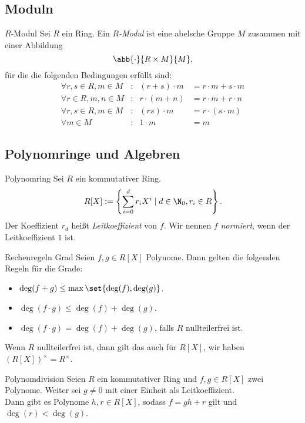 \subsection{Moduln}

\begin{karte}{\(R\)-Modul}
    Sei \(R\) ein Ring. Ein \textit{\(R\)-Modul} ist eine abelsche 
    Gruppe \(M\) zusammen mit einer Abbildung 
    \[ \abb{\cdot}{R\times M}{M}, \]
    für die die folgenden Bedingungen erfüllt sind: 
    \begin{align*}
        \forall r,s\in R, m \in M&: &(r+s)\cdot m &= r\cdot m + s \cdot m \\
        \forall r\in R, m,n\in M&: &r\cdot (m+n) &= r \cdot m + r \cdot n \\
        \forall r,s\in R, m\in M&: &(rs) \cdot m &= r \cdot (s \cdot m) \\
        \forall m\in M&: &1 \cdot m &= m
    \end{align*}
\end{karte}

\subsection{Polynomringe und Algebren}

\begin{karte}{Polynomring}
    Sei \(R\) ein kommutativer Ring. 
    \[ R[X] := \left\{ \sum_{i=0}^d r_i X^i \;|\; d\in \N_0, r_i \in R \right\}. \]
    Der Koeffizient \(r_d\) heißt \textit{Leitkoeffizient} von \(f\). 
    Wir nennen \(f\) \textit{normiert}, wenn der Leitkoeffizient \(1\) ist.
\end{karte}

\begin{karte}{Rechenregeln Grad}
    Seien \(f,g\in R[X]\) Polynome. Dann gelten die folgenden 
    Regeln für die Grade: 
    \begin{itemize}
        \item \( \deg(f+g) \leq \max\set{\deg(f), \deg(g)} \).
        \item \( \deg(f\cdot g) \leq \deg(f) + \deg(g) \).
        \item \( \deg(f\cdot g) = \deg(f) + \deg(g) \), falls \(R\) nullteilerfrei ist.
    \end{itemize}
    Wenn \(R\) nullteilerfrei ist, dann gilt das auch für 
    \(R[X]\), wir haben \( (R[X])^\times = R^\times \).
\end{karte}

\begin{karte}{Polynomdivision}
    Seien \(R\) ein kommutativer Ring und \(f,g\in R[X]\) zwei Polynome. 
    Weiter sei \(g\neq 0\) mit einer Einheit als Leitkoeffizient.\\
    Dann gibt es Polynome \(h,r\in R[X]\), sodass \(f=gh+r\) 
    gilt und \(\deg(r) < \deg(g)\).
\end{karte}

